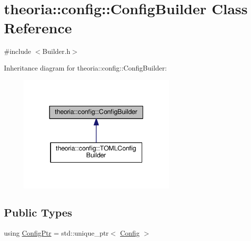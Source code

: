 \hypertarget{classtheoria_1_1config_1_1ConfigBuilder}{}\section{theoria\+:\+:config\+:\+:Config\+Builder Class Reference}
\label{classtheoria_1_1config_1_1ConfigBuilder}


{\ttfamily \#include $<$Builder.\+h$>$}



Inheritance diagram for theoria\+:\+:config\+:\+:Config\+Builder\+:\nopagebreak
\begin{figure}[H]
\begin{center}
\leavevmode
\includegraphics[width=223pt]{classtheoria_1_1config_1_1ConfigBuilder__inherit__graph}
\end{center}
\end{figure}
\subsection*{Public Types}
\begin{DoxyCompactItemize}
\item 
using \hyperlink{classtheoria_1_1config_1_1ConfigBuilder_a31d4cfc983e8ad468c483822731d790f}{Config\+Ptr} = std\+::unique\+\_\+ptr$<$ \hyperlink{classtheoria_1_1config_1_1Config}{Config} $>$
\end{DoxyCompactItemize}
